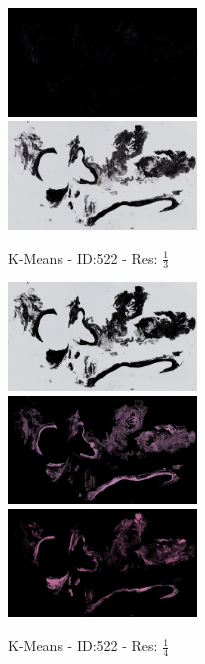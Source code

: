 \documentclass[a4paper,10pt,oneside]{article}
\begin{document}
\begin{figure}[hbtp]
  \begin{subfigure}[b]{5cm}
    \includegraphics[width=5cm]{visualization/results/kmeans/res_reduce_3/Region_0_PO13-00522A1_1_2_201305171639.png}
    \includegraphics[width=5cm]{visualization/results/kmeans/res_reduce_3/Region_2_PO13-00522A1_1_2_201305171639.png}
    \caption{K-Means - ID:522 - Res: $\frac{1}{3}$}
  \end{subfigure}
  \begin{subfigure}[b]{5cm}
    \includegraphics[width=5cm]{visualization/results/kmeans/res_reduce_4/Region_0_PO13-00522A1_1_2_201305171639.png}
    \includegraphics[width=5cm]{visualization/results/kmeans/res_reduce_4/Region_1_PO13-00522A1_1_2_201305171639.png}
    \includegraphics[width=5cm]{visualization/results/kmeans/res_reduce_4/Region_2_PO13-00522A1_1_2_201305171639.png}
    \caption{K-Means - ID:522 - Res: $\frac{1}{4}$}
  \end{subfigure}
  \begin{subfigure}[b]{5cm}

\end{subfigure}
\end{figure}
\end{document}

